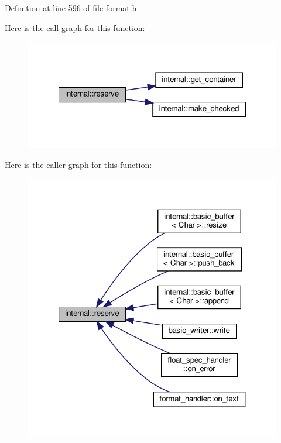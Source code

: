 Definition at line 596 of file format.\+h.

Here is the call graph for this function\+:
\nopagebreak
\begin{figure}[H]
\begin{center}
\leavevmode
\includegraphics[width=322pt]{namespaceinternal_ac4b0a3ecf8e30e217ef1dacb83170118_cgraph}
\end{center}
\end{figure}
Here is the caller graph for this function\+:
\nopagebreak
\begin{figure}[H]
\begin{center}
\leavevmode
\includegraphics[width=321pt]{namespaceinternal_ac4b0a3ecf8e30e217ef1dacb83170118_icgraph}
\end{center}
\end{figure}
\mbox{\label{namespaceinternal_a4200c951ca5aabed226d4bd926103ed2}} 
